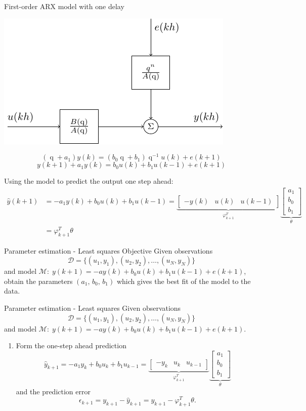 \documentclass[presentation,aspectratio=169]{beamer}
\DeclareMathOperator{\shift}{q}
\begin{document}
\begin{frame}[label={sec:org43fbae7}]{First-order ARX model with one delay}
\begin{center}
\includegraphics[width=0.3\linewidth]{../../figures/block-arx}
\end{center}
\[ (\shift + a_1) y(k) = (b_0 \shift + b_1) \shift^{-1}u(k) + e(k+1) \]
\[ y(k+1) +  a_1y(k) = b_0u(k) + b_1u(k-1) + e(k+1) \]

\pause

Using the model to predict the output one step ahead:
\begin{align*}
 \hat{y}(k+1) &= -a_1y(k) + b_0u(k) + b_1u(k-1) =  \underbrace{\begin{bmatrix} -y(k) & u(k) & u(k-1) \end{bmatrix}}_{\varphi_{k+1}^T} \underbrace{\begin{bmatrix} a_1\\b_0\\b_1\end{bmatrix}}_{\theta}\\
 &= \varphi_{k+1}^T\theta
 \end{align*}
\end{frame}



\begin{frame}[label={sec:org82bc73b}]{Parameter estimation - Least squares}
\alert{Objective} Given observations \[\mathcal{D} = \{ (u_1,y_1), (u_2, y_2), \ldots, (u_N, y_N)\}\] and model \(\mathcal{M}: \; y(k+1) = -ay(k) + b_0u(k) + b_1u(k-1)  + e(k+1)\), obtain the parameters \((a_1,\,b_0,\,b_1)\) which gives the best fit of the model to the data.
\end{frame}



\begin{frame}[label={sec:orgee9dfe7}]{Parameter estimation - Least squares}
Given observations \[\mathcal{D} = \{ (u_1,y_1), (u_2, y_2), \ldots, (u_N, y_N)\}\] and model \(\mathcal{M}: \; y(k+1) = -ay(k) + b_0u(k) + b_1u(k-1)  + e(k+1)\).

\begin{enumerate}
\item Form the one-step ahead prediction
\[ \hat{y}_{k+1} = -a_1y_k + b_0u_k + b_1u_{k-1} =  \underbrace{\begin{bmatrix} -y_k & u_k & u_{k-1} \end{bmatrix}}_{\varphi_{k+1}^T} \underbrace{\begin{bmatrix} a_1\\b_0\\b_1\end{bmatrix}}_{\theta}\] and the prediction error
   \[ \epsilon_{k+1} = y_{k+1} - \hat{y}_{k+1} = y_{k+1} - \varphi_{k+1}^T\theta.\]
\end{enumerate}
\end{frame}
\end{document}
